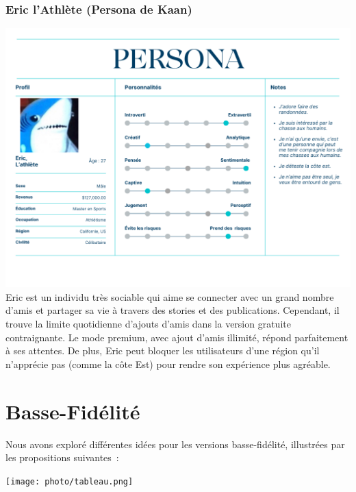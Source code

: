 \documentclass{article}
\begin{document}
\subsubsection*{Eric l’Athlète (Persona de Kaan)}
\includegraphics[width=1\textwidth]{photo/Personna_Kaan.png}\\

Eric est un individu très sociable qui aime se connecter avec un grand nombre d’amis et partager 
sa vie à travers des stories et des publications. 
Cependant, il trouve la limite quotidienne d’ajouts d’amis dans la version gratuite contraignante. 
Le mode premium, avec ajout d’amis illimité, répond parfaitement à ses attentes. 
De plus, Eric peut bloquer les utilisateurs d’une région qu’il n’apprécie pas (comme la côte Est) 
pour rendre son expérience plus agréable.



\section{Basse-Fidélité}
Nous avons exploré différentes idées pour les versions basse-fidélité, illustrées par 
les propositions suivantes : 

\texttt{[image: photo/tableau.png]}
\end{document}
